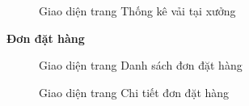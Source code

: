 \begin{figure}[H]
    \begin{center}
        \caption{Giao diện trang Thống kê vải tại xưởng}
        \label{result_ton_kho_xuong}
    \end{center}
\end{figure}

\textbf{Đơn đặt hàng}

\begin{figure}[H]
    \begin{center}
        \caption{Giao diện trang Danh sách đơn đặt hàng}
        \label{result_danh_sach_don_hang}
    \end{center}
\end{figure}

\begin{figure}[H]
    \begin{center}
        \caption{Giao diện trang Chi tiết đơn đặt hàng}
        \label{result_chi_tiet_don_hang}
    \end{center}
\end{figure}

